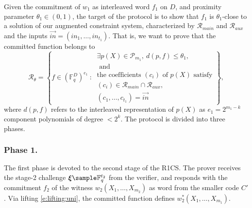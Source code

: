 Given the commitment of $w_1$ as interleaved word $f_1$ on $D$, and proximity parameter $\theta_1\in (0,1)$, the target of the protocol is to show that $f_1$ is $\theta_1$-close to a solution of our augmented constraint system, characterized by  $\mathscr R_{main}$ and $\mathscr R_{aux}$ and the inputs $\vec{in} = (in_1,\ldots, in_{t_1})$.
%
That is, we want to prove that the committed function belongs to
\begin{equation}
\label{e:IOPP:main:R:0}
\mathcal R_\theta = \left\{
    f\in \left(\mathbb F_q^{D}\right)^{e_1} \::\:
    \begin{matrix}
    \exists p(X) \in\mathscr P_{m_1},  %
    \: 
    d(p, f) \leq \theta_1,
    \\
    \text{ and }
    \\
    \text{the coefficients $(c_i)$ of $p(X)$ satisfy} 
    \\
    (c_i)  \in \mathscr R_{main} \cap \mathscr R_{aux},
    \\
    (c_1,\ldots,c_{t_1}) = \vec{in}
    \end{matrix}
\right\},
\end{equation}
where $d(p,f)$ refers to the interleaved representation of $p(X)$ as  $e_1 = 2^{m_1-k}$ component polynomials of degree $< 2^{k}$.
The protocol is divided into three phases.

\subsubsection{Phase 1.}
The first phase is devoted to the second stage of the R1CS.
The prover receives the stage-2 challenge $\vec\xi\sample\mathbb F_q^{t_2}$ from the verifier, and responds with the commitment $f_2$ of the witness $w_2(X_1,\ldots, X_{m_2})$ as word from the smaller code $C'$.
Via lifting \eqref{e:lifting:uni}, the committed function defines $w_2^*(X_1,\ldots, X_{m_1})$. 


